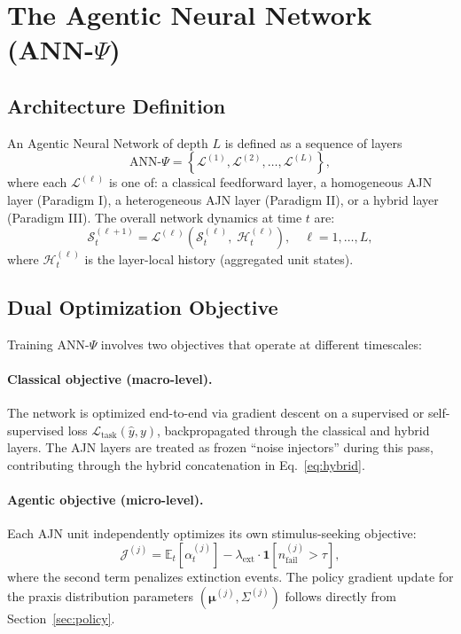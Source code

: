 \documentclass[12pt,a4paper]{article}
\begin{document}
\section{The Agentic Neural Network (ANN-$\Psi$)}
\label{sec:network_arch}

\subsection{Architecture Definition}

An Agentic Neural Network of depth $L$ is defined as a sequence of layers
\[
\text{ANN-}\Psi = \left\{
\mathcal{L}^{(1)}, \mathcal{L}^{(2)}, \ldots, \mathcal{L}^{(L)}
\right\},
\]
where each $\mathcal{L}^{(\ell)}$ is one of: a classical feedforward layer,
a homogeneous AJN layer (Paradigm I), a heterogeneous AJN layer (Paradigm II),
or a hybrid layer (Paradigm III). The overall network dynamics at time $t$ are:
\begin{equation}
\mathcal{S}_t^{(\ell+1)} = \mathcal{L}^{(\ell)}\!\left(\mathcal{S}_t^{(\ell)},\;
\mathcal{H}_t^{(\ell)}\right), \quad \ell = 1, \ldots, L,
\end{equation}
where $\mathcal{H}_t^{(\ell)}$ is the layer-local history (aggregated unit states).

\subsection{Dual Optimization Objective}

Training ANN-$\Psi$ involves two objectives that operate at different timescales:

\paragraph{Classical objective (macro-level).}
The network is optimized end-to-end via gradient descent on a supervised or
self-supervised loss $\mathcal{L}_{\text{task}}(\hat{y}, y)$, backpropagated
through the classical and hybrid layers. The AJN layers are treated as frozen
``noise injectors'' during this pass, contributing through the hybrid concatenation
in Eq.~\eqref{eq:hybrid}.

\paragraph{Agentic objective (micro-level).}
Each AJN unit independently optimizes its own stimulus-seeking objective:
\begin{equation}
\mathcal{J}^{(j)} = \mathbb{E}_t\!\left[\alpha_t^{(j)}\right]
- \lambda_{\text{ext}} \cdot \mathbf{1}\!\left[n_{\text{fail}}^{(j)} > \tau\right],
\label{eq:unit_obj}
\end{equation}
where the second term penalizes extinction events. The policy gradient update for
the praxis distribution parameters $(\boldsymbol{\mu}^{(j)}, \Sigma^{(j)})$
follows directly from Section~\ref{sec:policy}.
\end{document}
